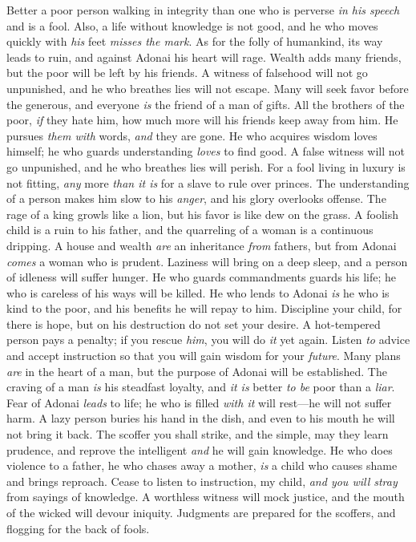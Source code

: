\begin{biblechapter} %
\verse Better a poor person walking in integrity 
than one who is perverse \textit{in his speech} and is a fool.
\verse Also, a life without knowledge is not good, 
and he who moves quickly with \textit{his} feet \textit{misses the mark}.
\verse As for the folly of humankind, its way leads to ruin, 
and against Adonai his heart will rage.
\verse Wealth adds many friends, 
but the poor will be left by his friends.
\verse A witness of falsehood will not go unpunished, 
and he who breathes lies will not escape.
\verse Many will seek favor before the generous, 
and everyone \textit{is} the friend of a man of gifts.
\verse All the brothers of the poor, \textit{if} they hate him, 
how much more will his friends keep away from him. 
He pursues \textit{them with} words, \textit{and} they are gone.
\verse He who acquires wisdom loves himself; 
he who guards understanding \textit{loves} to find good.
\verse A false witness will not go unpunished, 
and he who breathes lies will perish.
\verse For a fool living in luxury is not fitting, 
\textit{any} more \textit{than it is} for a slave to rule over princes.
\verse The understanding of a person makes him slow to his \textit{anger}, 
and his glory overlooks offense.
\verse The rage of a king growls like a lion, 
but his favor is like dew on the grass.
\verse A foolish child is a ruin to his father, 
and the quarreling of a woman is a continuous dripping.
\verse A house and wealth \textit{are} an inheritance \textit{from} fathers, 
but from Adonai \textit{comes} a woman who is prudent.
\verse Laziness will bring on a deep sleep, 
and a person of idleness will suffer hunger.
\verse He who guards commandments guards his life; 
he who is careless of his ways will be killed.
\verse He who lends to Adonai \textit{is} he who is kind to the poor, 
and his benefits he will repay to him.
\verse Discipline your child, for there is hope, 
but on his destruction do not set your desire.
\verse A hot-tempered person pays a penalty; 
if you rescue \textit{him}, you will do \textit{it} yet again.
\verse Listen \textit{to} advice and accept instruction 
so that you will gain wisdom for your \textit{future}.
\verse Many plans \textit{are} in the heart of a man, 
but the purpose of Adonai will be established.
\verse The craving of a man \textit{is} his steadfast loyalty, 
and \textit{it is} better \textit{to be} poor than a \textit{liar}.
\verse Fear of Adonai \textit{leads} to life; 
he who is filled \textit{with it} will rest—he will not suffer harm.
\verse A lazy person buries his hand in the dish, 
and even to his mouth he will not bring it back.
\verse The scoffer you shall strike, and the simple, may they learn prudence, 
and reprove the intelligent \textit{and} he will gain knowledge.
\verse He who does violence to a father, he who chases away a mother, 
\textit{is} a child who causes shame and brings reproach.
\verse Cease to listen to instruction, my child, 
\textit{and you will stray} from sayings of knowledge.
\verse A worthless witness will mock justice, 
and the mouth of the wicked will devour iniquity.
\verse Judgments are prepared for the scoffers, 
and flogging for the back of fools.
\end{biblechapter}


